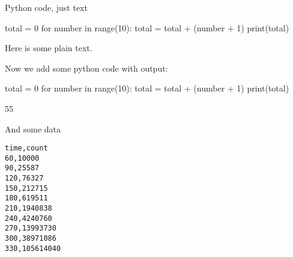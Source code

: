 \documentclass[%
oneside,                 %
final,                   %
10pt]{article}
\begin{document}

\newcommand{\exercisesection}[1]{\subsection*{#1}}





Python code, just text






\begin{python:nt}
total = 0
for number in range(10):
   total = total + (number + 1)
print(total)

\end{python:nt}


Here is some plain text.

Now we add some python code with output:






\begin{python:nt}
total = 0
for number in range(10):
   total = total + (number + 1)
print(total)

\end{python:nt}

\begin{python:nt}
55
\end{python:nt}

And some data













\begin{Verbatim}[numbers=none,fontsize=\fontsize{9pt}{9pt},baselinestretch=0.95]
time,count
60,10000
90,25587
120,76327
150,212715
180,619511
210,1940838
240,4240760
270,13993730
300,38971086
330,105614040

\end{Verbatim}


\end{document}
